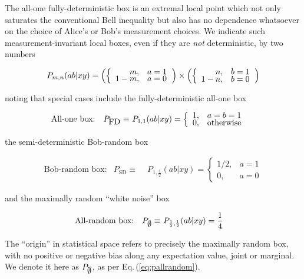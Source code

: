 \documentclass[
  12pt          %
  ,letterpaper  %
  ,center       %
  ,noupper      %
  ,english,fleqn]{uconnthesis}
\newcommand{\LeftEqns}[1]{\begin{fleqn}[\leftmargini minus \leftmargini]\begin{align}#1\end{align}\end{fleqn}}
\newcommand{\LeftEqn}[1]{\LeftEqns{\begin{split}#1\end{split}}}
\newcommand{\ceq}[1]{Eq.\,(\ref{#1})}
\begin{document}
The all-one fully-deterministic box is an extremal local point which not only saturates the conventional Bell inequality \cite{roberts_thesis} but also has no dependence whatsoever on the choice of Alice's or Bob's measurement choices. 
We indicate such measurement-invariant local boxes, even if they are {\em not} deterministic, by two numbers
\LeftEqn{\label{eq:plocalinvariant}
\renewcommand*{\arraystretch}{0.5}
P_{m,n}(ab|xy)=\left(\left\lbrace\begin{array}{rl} {m,}& {a=1} \\  {1-m,}& {a=0}\end{array}\right.\right)\times\left(\left\lbrace\begin{array}{rl} {n,}& {b=1} \\  {1-n,}& {b=0}\end{array}\right.\right)
}
noting that special cases include the fully-deterministic all-one box
\LeftEqns{\label{eq:pallone}
\renewcommand*{\arraystretch}{0.5}
&\text{All-one box:} & P_{\mbox{FD}} \equiv\,\, & P_{1,1}(ab|xy)=\left\lbrace\begin{array}{rl} {1,}& {a=b=1} \\  {0,}& {\text{otherwise}}\end{array}\right.  
&}
 the semi-deterministic Bob-random box\LeftEqns{\label{eq:pbobrandom}
&\text{Bob-random box:} & P_{\mbox{SD}} \equiv\,\, & P_{1,\frac{1}{2}}(ab|xy)=\left\lbrace\begin{array}{rl} {1/2,}& {a=1} \\  {0,}& {a=0}\end{array}\right. 
&}
and the maximally random ``white noise'' box
\LeftEqns{\label{eq:pallrandom} 
&\text{All-random box:} & P_{\mathlarger{\operatorname{{\emptyset}}}} \equiv\,\, & P_{\frac{1}{2},\frac{1}{2}}(ab|xy)=\frac{1}{4} &
}
The ``origin'' in statistical space refers to precisely the maximally random box, with no positive or negative bias along any expectation value, joint or marginal. We denote it here as $P_{\mathlarger{\operatorname{{\emptyset}}}}$, as per \ceq{eq:pallrandom}. 
\end{document}
